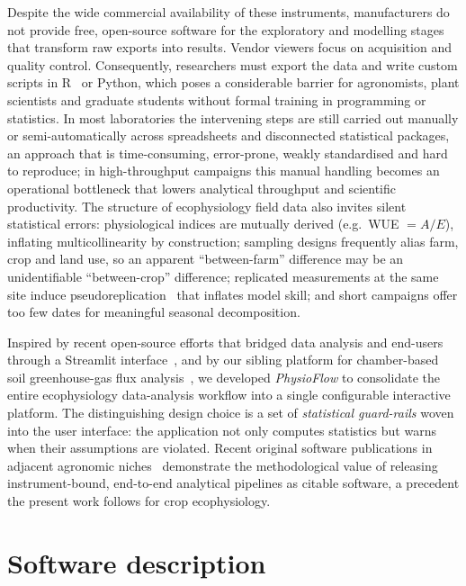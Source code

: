 \documentclass[preprint,12pt,a4paper]{elsarticle}
\begin{document}
Despite the wide commercial availability of these instruments, manufacturers do not provide free, open-source software for the exploratory and modelling stages that transform raw exports into results. Vendor viewers focus on acquisition and quality control. Consequently, researchers must export the data and write custom scripts in R~\cite{Rcore} or Python, which poses a considerable barrier for agronomists, plant scientists and graduate students without formal training in programming or statistics. In most laboratories the intervening steps are still carried out manually or semi-automatically across spreadsheets and disconnected statistical packages, an approach that is time-consuming, error-prone, weakly standardised and hard to reproduce; in high-throughput campaigns this manual handling becomes an operational bottleneck that lowers analytical throughput and scientific productivity. The structure of ecophysiology field data also invites silent statistical errors: physiological indices are mutually derived (e.g.\ WUE $= A/E$), inflating multicollinearity by construction; sampling designs frequently alias farm, crop and land use, so an apparent ``between-farm'' difference may be an unidentifiable ``between-crop'' difference; replicated measurements at the same site induce pseudoreplication~\cite{Hurlbert1984} that inflates model skill; and short campaigns offer too few dates for meaningful seasonal decomposition.

Inspired by recent open-source efforts that bridged data analysis and end-users through a Streamlit interface~\cite{Streamlit}, and by our sibling platform for chamber-based soil greenhouse-gas flux analysis~\cite{DaSilva2026Goias}, we developed \emph{PhysioFlow} to consolidate the entire ecophysiology data-analysis workflow into a single configurable interactive platform. The distinguishing design choice is a set of \emph{statistical guard-rails} woven into the user interface: the application not only computes statistics but warns when their assumptions are violated. Recent original software publications in adjacent agronomic niches~\cite{Magnani2026apsimNGpy,Crecco2026prismatools} demonstrate the methodological value of releasing instrument-bound, end-to-end analytical pipelines as citable software, a precedent the present work follows for crop ecophysiology.

\section{Software description}\label{sec:software}
\end{document}
